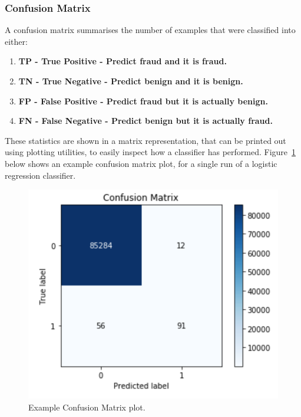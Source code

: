 \documentclass[12pt,a4paper,twoside]{report}
\begin{document}
\subsubsection{Confusion Matrix}

A confusion matrix summarises the number of examples that were classified into either:\\
\begin{enumerate}
\item \textbf{TP - True Positive - Predict fraud and it is fraud.}
\item \textbf{TN - True Negative - Predict benign and it is benign.}
\item \textbf{FP - False Positive - Predict fraud but it is actually benign.}
\item \textbf{FN - False Negative - Predict benign but it is actually fraud.}

\end{enumerate}

These statistics are shown in a matrix representation, that can be printed out using plotting utilities, to easily inspect how a classifier has performed. Figure~\ref{fig:cm-example} below shows an example confusion matrix plot, for a single run of a logistic regression classifier. 

\begin{figure}[H]
\centering
\includegraphics[scale=0.6]{cm-example}
\caption{Example Confusion Matrix plot.}
\label{fig:cm-example}
\end{figure}
\end{document}
